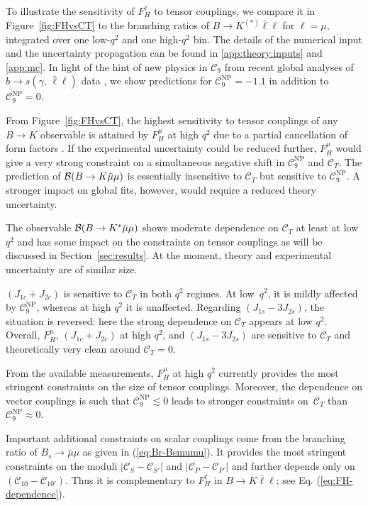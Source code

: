 \documentclass[twocolumn,epjc3]{svjour3}
\numberwithin{equation}{section}
\def \refeq#1{(\ref{#1})}
\def \refsec#1{Section~\ref{#1}}
\def \refapp#1{\ref{#1}}
\def \reffig#1{Figure~\ref{#1}}
\newcommand{\wilson}[2][{}]{\mathcal{C}_{#2}^{\mathrm{#1}}}
\renewcommand{\[}{\big[}
\renewcommand{\]}{\big]}
\renewcommand{\(}{\big(}
\renewcommand{\)}{\big)}
\begin{document}
To illustrate the sensitivity of $F_H^\ell$ to tensor couplings, we compare it
in \reffig{fig:FHvsCT} to the branching ratios of $B\to K^{(*)} \bar\ell\ell$
for {$\ell = \mu$}, integrated over one low-$q^2$ and one high-$q^2$ bin. The
details of the numerical input and the uncertainty propagation can be found in
\refapp{app:theory:inputs} and \refapp{app:mc}.  In light of the hint of new
physics in $\wilson{9}$ from recent global analyses of $b\to s (\gamma,\,
\bar\ell\ell)$ data \cite{Descotes-Genon:2013wba, Altmannshofer:2013foa,
  Beaujean:2013soa, Hurth:2014vma, Altmannshofer:2014rta}, we show predictions
for $\wilson[NP]{9} = -1.1$ in addition to $\wilson[NP]{9} = 0$.

From \reffig{fig:FHvsCT}, the highest sensitivity to tensor couplings of any $B
\to K$ observable is attained by {$F_H^\mu$} at high $q^2$ due to a partial
cancellation of form factors \cite{Bobeth:2012vn}. If the experimental
uncertainty could be reduced further, {$F_H^\mu$} would give a very strong
constraint on a simultaneous negative shift in $\wilson[NP]{9}$ and
{$\wilson{T}$}. The prediction of {${\cal B}(B\to K \bar\mu\mu)$} is
essentially insensitive to $\wilson{T}$ but sensitive to {$\wilson[NP]{9}$}. A
stronger impact on global fits, however, would {require a} reduced theory
uncertainty.

The observable {${\cal B}(B\to K^* \bar\mu\mu)$} shows moderate dependence on
$\wilson{T}$ at least at low $q^2$ and has some impact on the constraints on
tensor couplings as will be discussed in \refsec{sec:results}. At the moment,
theory and experimental uncertainty are of similar size.

$(J_{1c}+J_{2c})$ is sensitive to $\wilson{T}$ in both $q^2$ regimes. At low~$q^2$,
it is mildly affected by $\wilson[NP]{9}$, whereas at high $q^2$ it is
unaffected. Regarding $(J_{1s}-3J_{2s})$, the situation is reversed: here the
strong dependence on $\wilson{T}$ appears at low $q^2$.  Overall, {$F_H^\mu$},
$(J_{1c}+J_{2c})$ at {high} $q^2$, and $(J_{1s}-3J_{2s})$ are sensitive
to $\wilson{T}$ and theoretically very clean around $\wilson{T}=0$.

From the available measurements, {$F_H^\mu$} at high $q^2$ currently provides the
most stringent constraints on the size of tensor couplings. Moreover, the
dependence on vector couplings is such that $\wilson[NP]{9} \lesssim 0$ leads to
stronger constraints on~$\wilson{T}$ than $\wilson[NP]{9} \approx
0$.

Important additional constraints on scalar couplings come from the
branching ratio of $B_s \to \bar\mu\mu$ as given in
\refeq{eq:Br-Bsmumu}. It provides the most stringent constraints on
the moduli $|\wilson{S} - \wilson{S'}|$ and $|\wilson{P} -
\wilson{P'}|$ and further depends only on $(\wilson{10} -
\wilson{10'})$. Thus it is complementary to $F_H^{\ell}$ in $B\to K
\bar\ell\ell$; see Eq. \refeq{eq:FH-dependence}.
\end{document}
